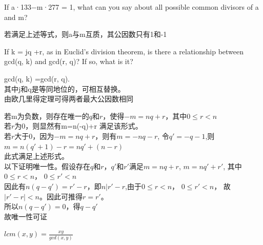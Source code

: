 \documentclass[a4paper, justified]{tufte-handout}
\begin{document}
\begin{problem}[CS 2.2-6]
If a·133−m·277 = 1, what can you say about all possible common divisors of a and
m?
\end{problem}

\begin{solution}
若满足上述等式，则a与m互质，其公因数只有1和-1
\end{solution}

\begin{problem}[CS 2.2-8]
If k = jq +r, as in Euclid’s division theorem, is there a relationship between gcd(q, k)
and gcd(r, q)? If so, what is it?
\end{problem}

\begin{solution}
gcd(q, k) =gcd(r, q).\\
其中j和q是等同地位的，可相互替换。\\
由欧几里得定理可得两者最大公因数相同
\end{solution}

\begin{problem}[CS 2.2-16]
\end{problem}

\begin{solution}
若m为负数，则存在唯一的$q$和$r$，使得$-m=nq+r$，其中$0\leq r<n$\\
若$r$为0，则显然有m=n(-q)+r 满足该形式。\\
若$r$大于0，因为$-m=nq+r$，则有$m=-nq-r$, 令$q'=-q-1$,则$m=n(q'+1)-r=nq'+(n-r)$\\
此式满足上述形式。\\
以下证明唯一性。假设存在$q$和$r$，$q'$和$r'$满足$m=nq+r$, $m=nq'+r'$, 其中$0\leq r<n$， $0\leq r'<n$\\
因此有$n(q-q')=r'-r$，即$n|r'-r$,由于$0\leq r<n$， $0\leq r'<n$， 故$|r'-r|<n$。因此可推得$r=r'$。\\
所以$n(q-q')=0$，得$q-q'$\\
故唯一性可证
\end{solution}

\begin{problem}[CS 2.2-19]
\end{problem}

\begin{solution}
$lcm(x,y)=\frac{xy}{gcd(x,y)}$
\end{solution}
\beginoptional
\end{document}
